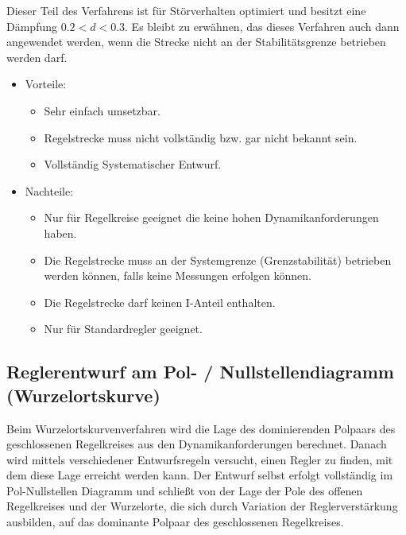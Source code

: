 %
Dieser Teil des Verfahrens ist für Störverhalten optimiert und besitzt eine Dämpfung $0.2<d<0.3$. Es bleibt zu erwähnen, das dieses Verfahren auch dann angewendet werden, wenn die Strecke nicht an der Stabilitätsgrenze betrieben werden darf.
%
\begin{itemize}
	\item Vorteile: 
	\begin{itemize}
		\item Sehr einfach umsetzbar.
		\item Regelstrecke muss nicht vollständig bzw. gar nicht bekannt sein.
		\item Vollständig Systematischer Entwurf.
	\end{itemize}
	\item Nachteile:
	\begin{itemize}
		\item Nur für Regelkreise geeignet die keine hohen Dynamikanforderungen haben.
		\item Die Regelstrecke muss an der Systemgrenze (Grenzstabilität) betrieben werden können, falls keine Messungen erfolgen können.
		\item Die Regelstrecke darf keinen I-Anteil enthalten. 
		\item Nur für Standardregler geeignet.
	\end{itemize}
\end{itemize}
%
\subsection{Reglerentwurf am Pol- / Nullstellendiagramm (Wurzelortskurve)}
\label{sec:WokEntwurf}
%
Beim Wurzelortskurvenverfahren wird die Lage des dominierenden Polpaars des geschlossenen Regelkreises aus den Dynamikanforderungen berechnet. Danach wird mittels verschiedener Entwurfsregeln versucht, einen Regler zu finden, mit dem diese Lage erreicht werden kann. Der Entwurf selbst erfolgt vollständig im Pol-Nullstellen Diagramm und schließt von der Lage der Pole des offenen Regelkreises und der Wurzelorte, die sich durch Variation der Reglerverstärkung ausbilden, auf das dominante Polpaar des geschlossenen Regelkreises.

